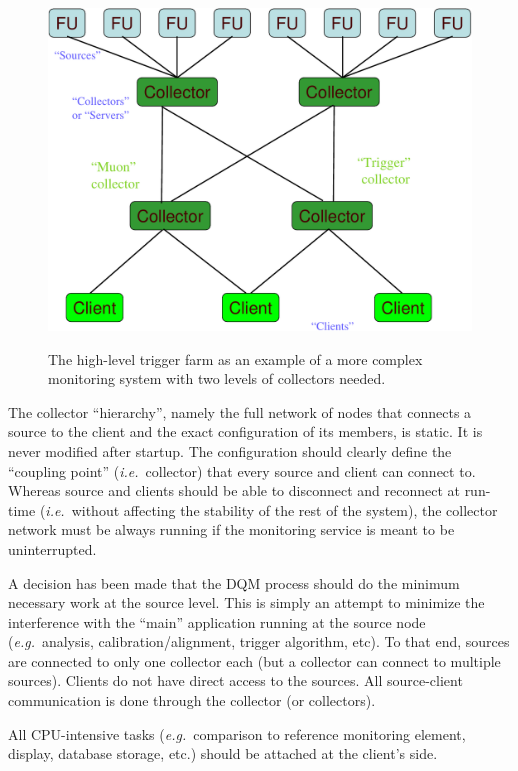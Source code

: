 \documentclass[a4paper]{cmspaper}
\newcommand {\ie}{\mbox{\sl i.e. }}     %
\newcommand {\eg}{\mbox{\sl e.g. }}     %
\begin{document}
\begin{figure}[hbtp]
  \begin{center}
    \resizebox{13cm}{!}
	{\includegraphics{figures/multiple_collectors}} 
\caption{The high-level trigger farm as an example of a more complex monitoring
system with two levels of collectors needed.}
\label{fig:multiple_collectors}
  \end{center}
\end{figure}
%
The collector ``hierarchy'', namely the full network of nodes that connects a
source to the client and the exact configuration of its members, is
static. It is never modified after startup. The configuration should
clearly define the ``coupling point'' (\ie collector) that  every
source and client can connect to. Whereas source and clients should be
able to disconnect and reconnect at run-time (\ie without affecting the
stability of the rest of the system), the collector network
must be always running if the monitoring service is meant to be uninterrupted.

A decision has been made that the DQM process should do the minimum
necessary work at the source level. This is simply an attempt to minimize the
interference with the ``main'' application running at the source
node (\eg analysis, calibration/alignment, trigger algorithm,
etc). To that end, sources are connected to only one collector each
(but a collector can connect to multiple sources). Clients do not have
direct access to the sources. All source-client communication is done
through the collector (or collectors). 

All CPU-intensive tasks (\eg comparison to reference monitoring
element, display, database storage, etc.) should be attached at the client's
side. 
\end{document}
